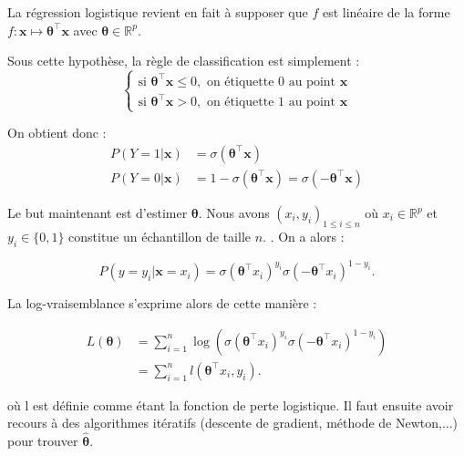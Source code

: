 \documentclass{article}
\begin{document}
La régression logistique revient en fait à supposer que \( f \) est linéaire de la forme \( f : \bm{x} \mapsto \bm{\theta}^\top \bm{x} \) avec \( \bm{\theta} \in \mathbb{R}^p \).


Sous cette hypothèse, la règle de classification est simplement :
\[
\begin{cases}
\text{si } \bm{\theta}^\top \bm{x}\leq 0 , \text{ on étiquette 0 au point } \bm{x} \\
\text{si } \bm{\theta}^\top \bm{x} > 0, \text{ on étiquette 1 au point } \bm{x}
\end{cases}
\]

On obtient donc :
\begin{align*}
    P(Y=1|\bm{x}) &= \sigma(\bm{\theta}^\top \bm{x}) \\
    P(Y=0|\bm{x}) &= 1- \sigma(\bm{\theta}^\top \bm{x}) = \sigma(-\bm{\theta}^\top \bm{x})
\end{align*}

Le but maintenant est d'estimer $\bm{\theta}$. Nous avons $(x_i, y_i)_{1 \leq i \leq n}$  où \(x_i \in \mathbb{R}^p\) et \(y_i \in \{0,1\}\) constitue un échantillon de taille \(n\).
. On a alors :

\[ P(y = y_i | \bm{x} = x_i) = \sigma(\bm{\theta}^\top x_i)^{y_i} \sigma(-\bm{\theta}^\top x_i)^{1-y_i}. \]

La log-vraisemblance s'exprime alors de cette manière :

\begin{align*}
    L(\bm{\theta}) &= \sum_{i=1}^{n} \log\left( \sigma(\bm{\theta}^\top x_i)^{y_i} \sigma(-\bm{\theta}^\top x_i)^{1-y_i} \right) \\
                   &= \sum_{i=1}^{n} l(\bm{\theta}^\top x_i, y_i).
\end{align*}

où l est définie comme étant la fonction de perte logistique. Il faut ensuite  avoir recours à des algorithmes itératifs (descente de gradient, méthode de Newton,...) pour trouver  $\bm{\hat{\theta}}$.
\end{document}
